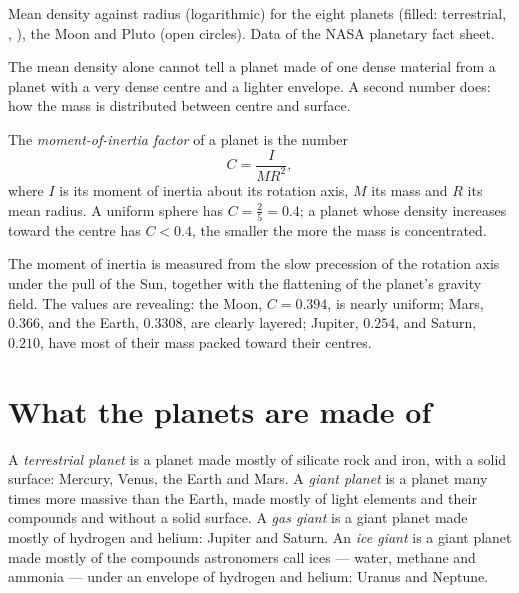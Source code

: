 \begin{omfigure}
{\small Mean density against radius (logarithmic) for the eight planets
(filled: terrestrial, , ), the Moon and Pluto (open
circles). Data of the NASA planetary fact sheet.}
\end{omfigure}

The mean density alone cannot tell a planet made of one dense material from
a planet with a very dense centre and a lighter envelope. A second number
does: how the mass is distributed between centre and surface.

\begin{definition}\label{def:b1:comparative-planetology:moi}
The \emph{moment-of-inertia factor} of a
planet is the number
\[
  C = \frac{I}{MR^2} ,
\]
where $I$ is its moment of inertia about its rotation axis, $M$ its mass and
$R$ its mean radius. A uniform sphere has $C = \tfrac25 = 0.4$; a planet
whose density increases toward the centre has $C < 0.4$, the smaller the
more the mass is concentrated.
\end{definition}

The moment of inertia is measured from the slow precession of the rotation
axis under the pull of the Sun, together with the flattening of the
planet's gravity field. The values are revealing: the Moon, $C = 0.394$, is
nearly uniform; Mars, $0.366$, and the Earth, $0.3308$, are clearly
layered; Jupiter, $0.254$, and Saturn, $0.210$, have most of their mass
packed toward their centres.

\section{What the planets are made of}

\begin{definition}\label{def:b1:comparative-planetology:planet-types}
A \emph{terrestrial planet} is a planet made
mostly of silicate rock and iron, with a solid surface: Mercury, Venus, the
Earth and Mars. A \emph{giant planet} is a planet many
times more massive than the Earth, made mostly of light elements and their
compounds and without a solid surface. A \emph{gas giant}
is a giant planet made mostly of hydrogen and helium: Jupiter and Saturn.
An \emph{ice giant} is a giant planet made mostly of the
compounds astronomers call ices --- water, methane and ammonia --- under an
envelope of hydrogen and helium: Uranus and Neptune.
\end{definition}


